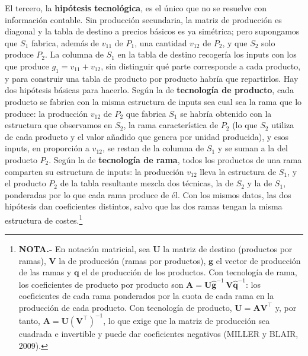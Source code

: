 \documentclass[10pt,a4paper]{article}
\begin{document}
El tercero, la \textbf{hipótesis tecnológica}, es el único que no se resuelve con información contable. Sin producción secundaria, la matriz de producción es diagonal y la tabla de destino a precios básicos es ya simétrica; pero supongamos que $S_1$ fabrica, además de $v_{11}$ de $P_1$, una cantidad $v_{12}$ de $P_2$, y que $S_2$ solo produce $P_2$. La columna de $S_1$ en la tabla de destino recogería los inputs con los que produce $g_1=v_{11}+v_{12}$, sin distinguir qué parte corresponde a cada producto, y para construir una tabla de producto por producto habría que repartirlos. Hay dos hipótesis básicas para hacerlo. Según la de \textbf{tecnología de producto}, cada producto se fabrica con la misma estructura de inputs sea cual sea la rama que lo produce: la producción $v_{12}$ de $P_2$ que fabrica $S_1$ se habría obtenido con la estructura que observamos en $S_2$, la rama característica de $P_2$ (lo que $S_2$ utiliza de cada producto y el valor añadido que genera por unidad producida), y esos inputs, en proporción a $v_{12}$, se restan de la columna de $S_1$ y se suman a la del producto $P_2$. Según la de \textbf{tecnología de rama}, todos los productos de una rama comparten su estructura de inputs: la producción $v_{12}$ lleva la estructura de $S_1$, y el producto $P_2$ de la tabla resultante mezcla dos técnicas, la de $S_2$ y la de $S_1$, ponderadas por lo que cada rama produce de él. Con los mismos datos, las dos hipótesis dan coeficientes distintos, salvo que las dos ramas tengan la misma estructura de costes.\footnote{%
    \textbf{NOTA.-} En notación matricial, sea $\mathbf{U}$ la matriz de destino (productos por ramas), $\mathbf{V}$ la de producción (ramas por productos), $\mathbf{g}$ el vector de producción de las ramas y $\mathbf{q}$ el de producción de los productos. Con tecnología de rama, los coeficientes de producto por producto son $\mathbf{A}=\mathbf{U}\hat{\mathbf{g}}^{-1}\,\mathbf{V}\hat{\mathbf{q}}^{-1}$: los coeficientes de cada rama ponderados por la cuota de cada rama en la producción de cada producto. Con tecnología de producto, $\mathbf{U}=\mathbf{A}\mathbf{V}^{\top}$ y, por tanto, $\mathbf{A}=\mathbf{U}(\mathbf{V}^{\top})^{-1}$, lo que exige que la matriz de producción sea cuadrada e invertible y puede dar coeficientes negativos (MILLER y BLAIR, 2009).
}
\end{document}

